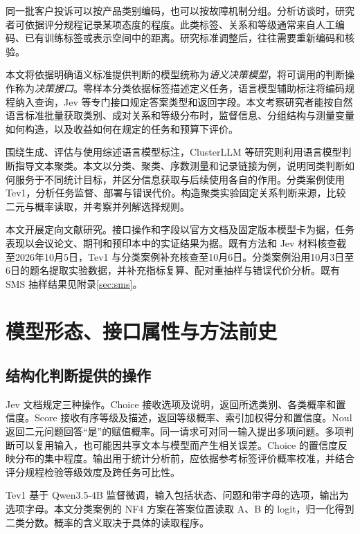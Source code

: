\documentclass[UTF8,a4paper,zihao=-4,fontset=fandol]{ctexart}
\begin{document}
同一批客户投诉可以按产品类别编码，也可以按故障机制分组。分析访谈时，研究者可依据评分规程记录某项态度的程度。此类标签、关系和等级通常来自人工编码、已有训练标签或表示空间中的距离。研究标准调整后，往往需要重新编码和核验。

本文将依据明确语义标准提供判断的模型统称为\emph{语义决策模型}，将可调用的判断操作称为\emph{决策接口}。零样本分类依据标签描述定义任务，语言模型辅助标注将编码规程纳入查询，Jev 等专门接口规定答案类型和返回字段\citep{yin2019,tan2024,typesafe-intro}。本文考察研究者能按自然语言标准批量获取类别、成对关系和等级分布时，监督信息、分组结构与测量变量如何构造，以及收益如何在规定的任务和预算下评价。

\citet{tan2024}围绕生成、评估与使用综述语言模型标注，ClusterLLM 等研究则利用语言模型判断指导文本聚类\citep{clusterllm2023,viswanathan2024,cequel2025}。本文以分类、聚类、序数测量和记录链接为例，说明同类判断如何服务于不同统计目标，并区分信息获取与后续使用各自的作用。分类案例使用 Tev1，分析任务监督、部署与错误代价。构造聚类实验固定关系判断来源，比较二元与概率读取，并考察并列解选择规则。

本文开展定向文献研究。接口操作和字段以官方文档及固定版本模型卡为据，任务表现以会议论文、期刊和预印本中的实证结果为据。既有方法和 Jev 材料核查截至2026年10月5日，Tev1 与分类案例补充核查至10月6日。分类案例沿用10月3日至6日的题名提取实验数据，并补充指标复算、配对重抽样与错误代价分析。既有 SMS 抽样结果见附录\ref{sec:sms}。

\section{模型形态、接口属性与方法前史}\label{sec:history}

\subsection{结构化判断提供的操作}

Jev 文档规定三种操作。Choice 接收选项及说明，返回所选类别、各类概率和置信度。Score 接收有序等级及描述，返回等级概率、索引加权得分和置信度。Noul 返回二元问题回答“是”的赋值概率\citep{typesafe-choice,typesafe-score,typesafe-noul}。同一请求可对同一输入提出多项问题\citep{typesafe-intro}。多项判断可以复用输入，也可能因共享文本与模型而产生相关误差。Choice 的置信度反映分布的集中程度。输出用于统计分析前，应依据参考标签评价概率校准，并结合评分规程检验等级效度及跨任务可比性。

Tev1 基于 Qwen3.5-4B 监督微调，输入包括状态、问题和带字母的选项，输出为选项字母\citep{tev1-card}。本文分类案例的 NF4 方案在答案位置读取 A、B 的 logit，归一化得到二类分数。概率的含义取决于具体的读取程序。
\end{document}
